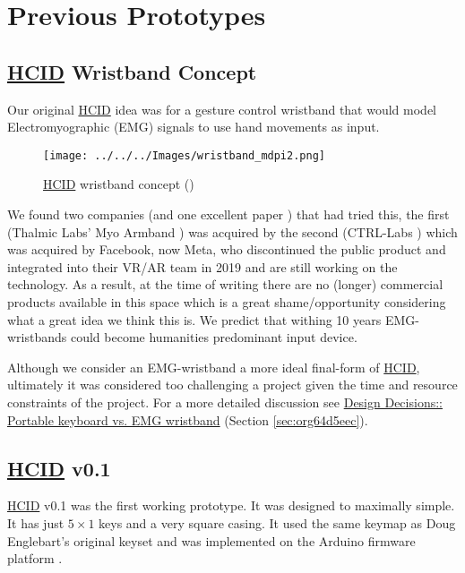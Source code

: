 \documentclass[logo,bsc,singlespacing,parskip]{infthesis}
\begin{document}
\chapter{Previous Prototypes}
\label{sec:org71da361}
\section{\hyperref[orgf95a76e]{HCID} Wristband Concept}
\label{sec:org055e0ef}
Our original \hyperref[orgf95a76e]{HCID} idea was for a gesture control wristband that would model Electromyographic (EMG) signals to use hand movements as input.

\begin{figure}[h]
\centering
\texttt{[image: ../../../Images/wristband\_mdpi2.png]}
\caption{\hyperref[orgf95a76e]{HCID} wristband concept (\autocite{cote-allardLowCostWireless3DPrinted2019})}
\end{figure}

We found two companies (and one excellent paper \autocite{cote-allardLowCostWireless3DPrinted2019}) that had tried this, the first (Thalmic Labs' Myo Armband \autocite{MyoGestureControl}) was acquired by the second (CTRL-Labs \autocite{27CTRLlabsLinkedIn}) which was acquired by Facebook, now Meta, who discontinued the public product and integrated into their VR/AR team in 2019 and are still working on the technology.
As a result, at the time of writing there are no (longer) commercial products available in this space which is a great shame/opportunity considering what a great idea we think this is.
We predict that withing 10 years EMG-wristbands could become humanities predominant input device.

Although we consider an EMG-wristband a more ideal final-form of \hyperref[orgf95a76e]{HCID}, ultimately it was considered too challenging a project given the time and resource constraints of the project. For a more detailed discussion see \hyperref[sec:org64d5eec]{Design Decisions:: Portable keyboard vs. EMG wristband} (Section \ref{sec:org64d5eec}).
\section{\hyperref[orgf95a76e]{HCID} v0.1}
\label{sec:orgc22bae4}
\hyperref[orgf95a76e]{HCID} v0.1
was the first working prototype.
It was designed to maximally simple.
It has just \(5\times1\) keys and a very square casing.
It used the same keymap as Doug Englebart's original keyset and was implemented on the Arduino firmware platform \autocite{ArduinoHome}.
\end{document}
